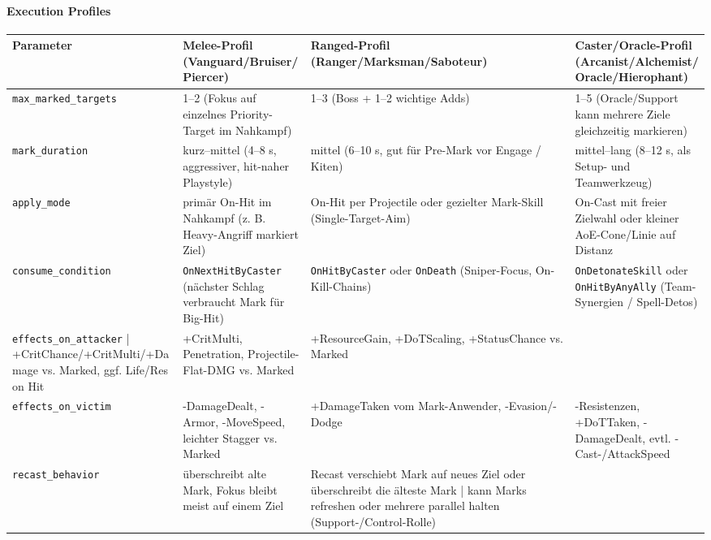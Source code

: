 \paragraph{Execution Profiles}{}
\scriptsize %
\begin{tabular}{p{3cm} | p{4cm} | p{4cm} | p{4cm}}
	Parameter             & Melee-Profil (Vanguard/Bruiser/Piercer)                            & Ranged-Profil (Ranger/Marksman/Saboteur)                                & Caster/Oracle-Profil (Arcanist/Alchemist/Oracle/Hierophant)                    \\
	\hline
	\texttt{max\_marked\_targets}  & 1–2 (Fokus auf einzelnes Priority-Target im Nahkampf)              & 1–3 (Boss + 1–2 wichtige Adds)                                           & 1–5 (Oracle/Support kann mehrere Ziele gleichzeitig markieren)                \\
	\texttt{mark\_duration}       & kurz–mittel (4–8 s, aggressiver, hit-naher Playstyle)             & mittel (6–10 s, gut für Pre-Mark vor Engage / Kiten)                     & mittel–lang (8–12 s, als Setup- und Teamwerkzeug)                             \\
	\texttt{apply\_mode}          & primär On-Hit im Nahkampf (z. B. Heavy-Angriff markiert Ziel)      & On-Hit per Projectile oder gezielter Mark-Skill (Single-Target-Aim)      & On-Cast mit freier Zielwahl oder kleiner AoE-Cone/Linie auf Distanz           \\
	\texttt{consume\_condition}   & \texttt{OnNextHitByCaster} (nächster Schlag verbraucht Mark für Big-Hit)  & \texttt{OnHitByCaster} oder \texttt{OnDeath} (Sniper-Focus, On-Kill-Chains)            & \texttt{OnDetonateSkill} oder \texttt{OnHitByAnyAlly} (Team-Synergien / Spell-Detos)        \\
	\texttt{effects\_on\_attacker} | +CritChance/+CritMulti/+Damage vs. Marked, ggf. Life/Res on Hit    & +CritMulti, Penetration, Projectile-Flat-DMG vs. Marked                  & +ResourceGain, +DoTScaling, +StatusChance vs. Marked                          \\
	\texttt{effects\_on\_victim}   & -DamageDealt, -Armor, -MoveSpeed, leichter Stagger vs. Marked      & +DamageTaken vom Mark-Anwender, -Evasion/-Dodge                          & -Resistenzen, +DoTTaken, -DamageDealt, evtl. -Cast-/AttackSpeed               \\
	\texttt{recast\_behavior}     & überschreibt alte Mark, Fokus bleibt meist auf einem Ziel          & Recast verschiebt Mark auf neues Ziel oder überschreibt die älteste Mark | kann Marks refreshen oder mehrere parallel halten (Support-/Control-Rolle)    \\
	\hline
\end{tabular}
\normalsize